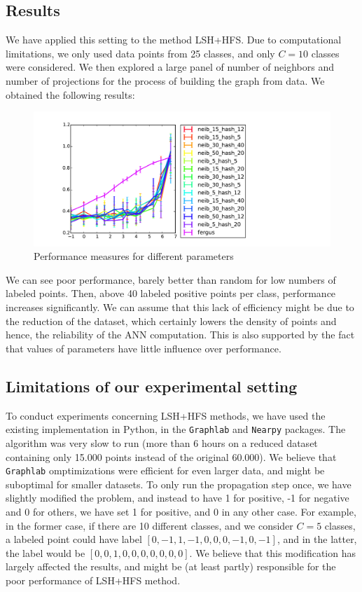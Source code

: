 \documentclass{article} %
\begin{document}
\subsection{Results}
We have applied this setting to the method LSH+HFS. Due to computational limitations, we only used data points from 25 classes, and only $C=10$ classes were considered. We then explored a large panel of number of neighbors and number of projections for the process of building the graph from data. We obtained the following results:

\begin{figure}[!h]
\hspace{-3cm}
\includegraphics[width=1.8\textwidth]{method_comp.pdf}
\caption{Performance measures for different parameters}
\label{variation}
\end{figure}

We can see poor performance, barely better than random for low numbers of labeled points. Then, above 40 labeled positive points per class, performance increases significantly. We can assume that this lack of efficiency might be due to the reduction of the dataset, which certainly lowers the density of points and hence, the reliability of the ANN computation. This is also supported by the fact that values of parameters have little influence over performance. 

\subsection{Limitations of our experimental setting}
To conduct experiments concerning LSH+HFS methods, we have used the existing implementation in Python, in the \texttt{Graphlab} and \texttt{Nearpy} packages. The algorithm was very slow to run (more than 6 hours on a reduced dataset containing only 15.000 points instead of the original 60.000). We believe that \texttt{Graphlab} omptimizations were efficient for even larger data, and might be suboptimal for smaller datasets. To only run the propagation step once, we have slightly modified the problem, and instead to have 1 for positive, -1 for negative and 0 for others, we have set 1 for positive, and 0 in any other case. For example, in the former case, if there are 10 different classes, and we consider $C=5$ classes, a labeled point could have label $[0, -1, 1, -1, 0, 0, 0, -1, 0, -1]$, and in the latter, the label would be $[0, 0, 1, 0, 0, 0, 0, 0, 0, 0]$. We believe that this modification has largely affected the results, and might be (at least partly) responsible for the poor performance of LSH+HFS method.
\end{document}
